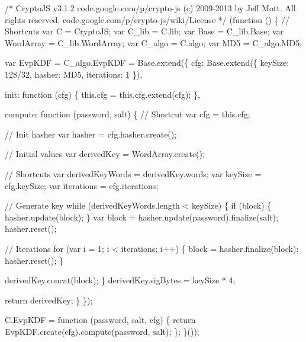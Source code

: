 \begin{DoxyCodeInclude}
\textcolor{comment}{/*}
\textcolor{comment}{CryptoJS v3.1.2}
\textcolor{comment}{code.google.com/p/crypto-js}
\textcolor{comment}{(c) 2009-2013 by Jeff Mott. All rights reserved.}
\textcolor{comment}{code.google.com/p/crypto-js/wiki/License}
\textcolor{comment}{*/}
(\textcolor{keyword}{function} () \{
    \textcolor{comment}{// Shortcuts}
    var C = CryptoJS;
    var C\_lib = C.lib;
    var Base = C\_lib.Base;
    var WordArray = C\_lib.WordArray;
    var C\_algo = C.algo;
    var MD5 = C\_algo.MD5;

    var EvpKDF = C\_algo.EvpKDF = Base.extend(\{
        cfg: Base.extend(\{
            keySize: 128/32,
            hasher: MD5,
            iterations: 1
        \}),

        init: \textcolor{keyword}{function} (cfg) \{
            this.cfg = this.cfg.extend(cfg);
        \},

        compute: \textcolor{keyword}{function} (password, salt) \{
            \textcolor{comment}{// Shortcut}
            var cfg = this.cfg;

            \textcolor{comment}{// Init hasher}
            var hasher = cfg.hasher.create();

            \textcolor{comment}{// Initial values}
            var derivedKey = WordArray.create();

            \textcolor{comment}{// Shortcuts}
            var derivedKeyWords = derivedKey.words;
            var keySize = cfg.keySize;
            var iterations = cfg.iterations;

            \textcolor{comment}{// Generate key}
            \textcolor{keywordflow}{while} (derivedKeyWords.length < keySize) \{
                \textcolor{keywordflow}{if} (block) \{
                    hasher.update(block);
                \}
                var block = hasher.update(password).finalize(salt);
                hasher.reset();

                \textcolor{comment}{// Iterations}
                \textcolor{keywordflow}{for} (var i = 1; i < iterations; i++) \{
                    block = hasher.finalize(block);
                    hasher.reset();
                \}

                derivedKey.concat(block);
            \}
            derivedKey.sigBytes = keySize * 4;

            \textcolor{keywordflow}{return} derivedKey;
        \}
    \});

    C.EvpKDF = \textcolor{keyword}{function} (password, salt, cfg) \{
        \textcolor{keywordflow}{return} EvpKDF.create(cfg).compute(password, salt);
    \};
\}());
\end{DoxyCodeInclude}
 